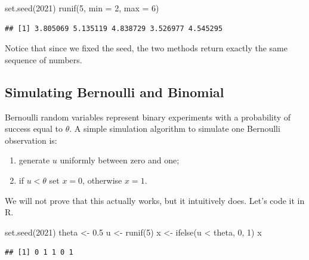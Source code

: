 \documentclass[
]{book}
\newenvironment{Shaded}{\begin{snugshade}}{\end{snugshade}}
\newcommand{\AttributeTok}[1]{\textcolor[rgb]{0.77,0.63,0.00}{#1}}
\newcommand{\DecValTok}[1]{\textcolor[rgb]{0.00,0.00,0.81}{#1}}
\newcommand{\FloatTok}[1]{\textcolor[rgb]{0.00,0.00,0.81}{#1}}
\newcommand{\FunctionTok}[1]{\textcolor[rgb]{0.00,0.00,0.00}{#1}}
\newcommand{\NormalTok}[1]{#1}
\newcommand{\OtherTok}[1]{\textcolor[rgb]{0.56,0.35,0.01}{#1}}
\newcommand{\SpecialCharTok}[1]{\textcolor[rgb]{0.00,0.00,0.00}{#1}}
\begin{document}
\begin{Shaded}
\begin{Highlighting}[]
\FunctionTok{set.seed}\NormalTok{(}\DecValTok{2021}\NormalTok{)}
\FunctionTok{runif}\NormalTok{(}\DecValTok{5}\NormalTok{, }\AttributeTok{min =} \DecValTok{2}\NormalTok{, }\AttributeTok{max =} \DecValTok{6}\NormalTok{)}
\end{Highlighting}
\end{Shaded}

\begin{verbatim}
## [1] 3.805069 5.135119 4.838729 3.526977 4.545295
\end{verbatim}

Notice that since we fixed the seed, the two methods return exactly the same sequence of numbers.

\hypertarget{simulating-bernoulli-and-binomial}{%
\subsection{Simulating Bernoulli and Binomial}\label{simulating-bernoulli-and-binomial}}

Bernoulli random variables represent binary experiments with a probability of success equal to \(\theta\). A simple simulation algorithm to simulate one Bernoulli observation is:

\begin{enumerate}
\def\labelenumi{\arabic{enumi}.}
\item
  generate \(u\) uniformly between zero and one;
\item
  if \(u< \theta\) set \(x=0\), otherwise \(x=1\).
\end{enumerate}

We will not prove that this actually works, but it intuitively does. Let's code it in R.

\begin{Shaded}
\begin{Highlighting}[]
\FunctionTok{set.seed}\NormalTok{(}\DecValTok{2021}\NormalTok{)}
\NormalTok{theta }\OtherTok{\textless{}{-}} \FloatTok{0.5}
\NormalTok{u }\OtherTok{\textless{}{-}} \FunctionTok{runif}\NormalTok{(}\DecValTok{5}\NormalTok{)}
\NormalTok{x }\OtherTok{\textless{}{-}} \FunctionTok{ifelse}\NormalTok{(u }\SpecialCharTok{\textless{}}\NormalTok{ theta, }\DecValTok{0}\NormalTok{, }\DecValTok{1}\NormalTok{)}
\NormalTok{x}
\end{Highlighting}
\end{Shaded}

\begin{verbatim}
## [1] 0 1 1 0 1
\end{verbatim}
\end{document}
